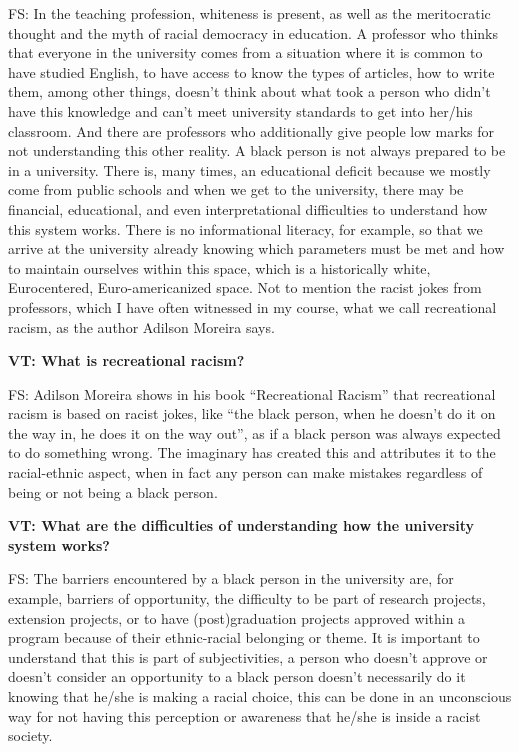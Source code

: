 \documentclass[a4paper,
fontsize=11pt,
oneside,
numbers=noperiodatend,
parskip=half-,
bibliography=totoc,
final
]{scrartcl}
\begin{document}
FS: In the teaching profession, whiteness is present, as well as the
meritocratic thought and the myth of racial democracy in education. A
professor who thinks that everyone in the university comes from a
situation where it is common to have studied English, to have access to
know the types of articles, how to write them, among other things,
doesn't think about what took a person who didn't have this knowledge
and can't meet university standards to get into her/his classroom. And
there are professors who additionally give people low marks for not
understanding this other reality. A black person is not always prepared
to be in a university. There is, many times, an educational deficit
because we mostly come from public schools and when we get to the
university, there may be financial, educational, and even
interpretational difficulties to understand how this system works. There
is no informational literacy, for example, so that we arrive at the
university already knowing which parameters must be met and how to
maintain ourselves within this space, which is a historically white,
Eurocentered, Euro-americanized space. Not to mention the racist jokes
from professors, which I have often witnessed in my course, what we call
recreational racism, as the author Adilson Moreira says.

\pagebreak

\textbf{VT: What is recreational racism?}

FS: Adilson Moreira shows in his book \enquote{Recreational Racism} that
recreational racism is based on racist jokes, like \enquote{the black
person, when he doesn't do it on the way in, he does it on the way out},
as if a black person was always expected to do something wrong. The
imaginary has created this and attributes it to the racial-ethnic
aspect, when in fact any person can make mistakes regardless of being or
not being a black person.

\textbf{VT: What are the difficulties of understanding how the
university system works?}

FS: The barriers encountered by a black person in the university are,
for example, barriers of opportunity, the difficulty to be part of
research projects, extension projects, or to have (post)graduation
projects approved within a program because of their ethnic-racial
belonging or theme. It is important to understand that this is part of
subjectivities, a person who doesn't approve or doesn't consider an
opportunity to a black person doesn't necessarily do it knowing that
he/she is making a racial choice, this can be done in an unconscious way
for not having this perception or awareness that he/she is inside a
racist society.
\end{document}
